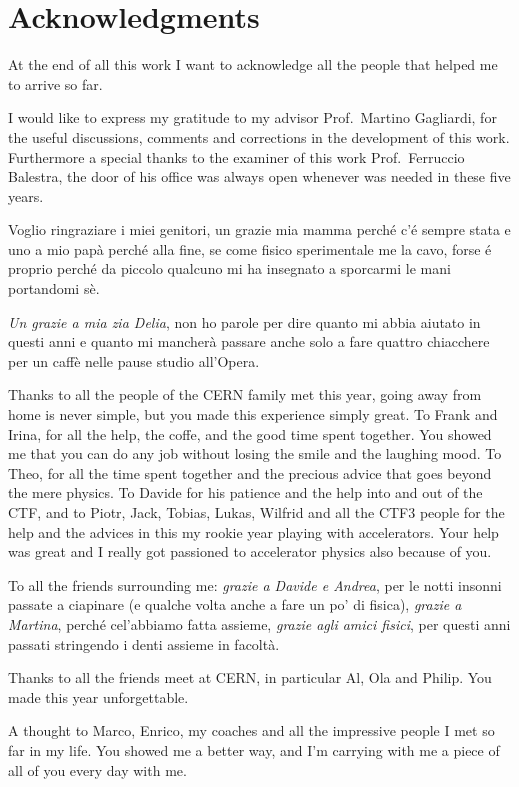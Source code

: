 \chapter*{Acknowledgments}

At the end of all this work I want to acknowledge all the people that helped me to arrive so far.

I would like to express my gratitude to my advisor Prof.~Martino Gagliardi, for the useful discussions, comments and corrections in the development of this work. Furthermore a special thanks to the examiner of this work Prof.~Ferruccio Balestra, the door of his office was always open whenever was needed in these five years. 

Voglio ringraziare i miei genitori, un grazie mia mamma perché c'é sempre stata e uno a mio pap\`a perché alla fine, se come fisico sperimentale me la cavo, forse é proprio perché da piccolo qualcuno mi ha insegnato a sporcarmi le mani portandomi s\`e.

\textit{Un grazie a mia zia Delia}, non ho parole per dire quanto mi abbia aiutato in questi anni e quanto mi mancher\`a passare anche solo a fare quattro chiacchere per un caff\`e nelle pause studio all'Opera.

Thanks to all the people of the CERN family met this year, going away from home is never simple, but you made this experience simply great. To Frank and Irina, for all the help, the coffe, and the good time spent together. You showed me that you can do any job without losing the smile and the laughing mood. To Theo, for all the time spent together and the precious advice that goes beyond the mere physics. To Davide for his patience and the help into and out of the CTF, and to Piotr, Jack, Tobias, Lukas, Wilfrid and all the CTF3 people for the help and the advices in this my rookie year playing with accelerators. Your help was great and I really got passioned to accelerator physics also because of you.

To all the friends surrounding me: \textit{grazie a Davide e Andrea}, per le notti insonni passate a ciapinare (e qualche volta anche a fare un po' di fisica), \textit{grazie a Martina}, perché cel'abbiamo fatta assieme, \textit{grazie agli amici fisici}, per questi anni passati stringendo i denti assieme in facolt\`a.

Thanks to all the friends meet at CERN, in particular Al, Ola and Philip. You made this year unforgettable.

A thought to Marco, Enrico, my coaches and all the impressive people I met so far in my life. You showed me a better way, and I'm carrying with me a piece of all of you every day with me.



